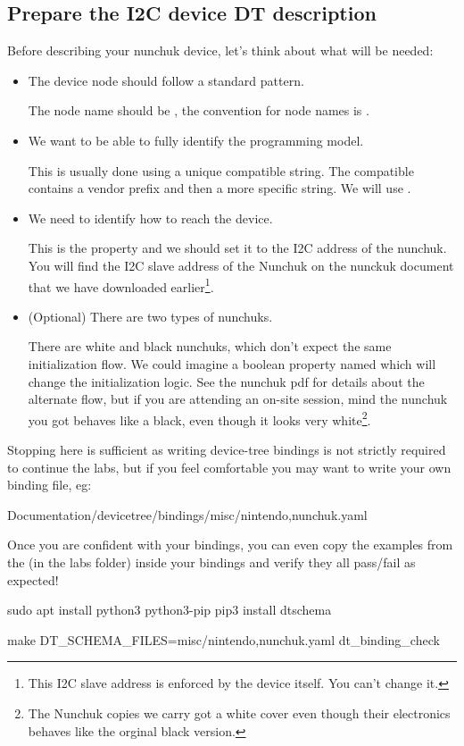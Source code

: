 
\subsection{Prepare the I2C device DT description}

Before describing your nunchuk device, let's think about what will be
needed:
\begin{itemize}
\item The device node should follow a standard pattern.

  The node name should be , the convention for node
  names is .

\item We want to be able to fully identify the programming model.

  This is usually done using a unique compatible string. The compatible
  contains a vendor prefix and then a more specific string. We will use
  .

\item We need to identify how to reach the device.

  This is the  property and we should set it to the I2C
  address of the nunchuk. You will find the I2C slave address of the
  Nunchuk on the nunckuk document that we have downloaded
  earlier\footnote{This I2C slave address is enforced by the device
    itself. You can't change it.}.

\item (Optional) There are two types of nunchuks.

  There are white and black nunchuks, which don't expect the same
  initialization flow. We could imagine a boolean property named
   which will change the initialization
  logic. See the nunchuk pdf for details about the alternate flow, but if you
  are attending an on-site session, mind the nunchuk you got behaves like a
  black, even though it looks very white\footnote{The Nunchuk copies we
  carry got a white cover even though their electronics behaves like the
  orginal black version.}.

\end{itemize}

Stopping here is sufficient as writing device-tree bindings is not
strictly required to continue the labs, but if you feel comfortable
you may want to write your own binding file, eg:
\begin{bashinput}
Documentation/devicetree/bindings/misc/nintendo,nunchuk.yaml
\end{bashinput}
Once you are confident with your bindings, you can even copy the
examples from the  (in the
 labs folder) inside your bindings and verify they all
pass/fail as expected!
\begin{bashinput}
sudo apt install python3 python3-pip
pip3 install dtschema

make DT_SCHEMA_FILES=misc/nintendo,nunchuk.yaml dt_binding_check
\end{bashinput}

